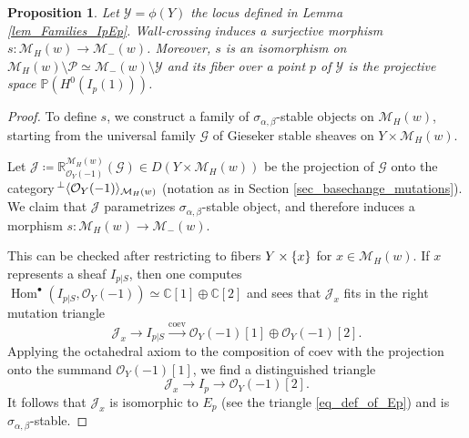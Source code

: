 \documentclass[11pt]{amsart}
\newtheorem{proposition}[thm]{Proposition}
\theoremstyle{definition}
\newcommand{\C}{\mathbb{C}}
\DeclareMathOperator{\Hom}{Hom}
\newcommand{\sO}{\mathcal{O}}
\newcommand{\sY}{\mathcal{Y}}
\newcommand{\sT}{\mathcal{T}}
\newcommand{\sM}{\mathcal{M}}
\newcommand{\sG}{\mathcal{G}}
\DeclarePairedDelimiter{\set}{\lbrace}{\rbrace}
\DeclarePairedDelimiter{\pair}{\langle}{\rangle}
\begin{document}
\begin{proposition}\label{prop_GiesekerVSTilt}
Let $\sY =\phi(Y)$ the locus defined in Lemma \ref{lem_Families_IpEp}.
Wall-crossing induces a surjective morphism $s:\sM_H(w) \to \mathcal{M}_-(w)$. Moreover, $s$ is an isomorphism on $\sM_H(w) \setminus \mathcal{P}\simeq \mathcal{M}_-(w)\setminus \sY$ and its fiber over a point $p$ of $\sY$ is the projective space $\mathbb P(H^0(I_p(1)))$. 
\end{proposition}

\begin{proof}

To define $s$, we construct a family of $\sigma_{\alpha,\beta}$-stable objects on $\sM_H(w)$, starting from the universal family $\sG$ of Gieseker stable sheaves on $Y\times \sM_H(w)$. 

Let $\mathcal J \coloneqq \mathbb R_{\sO_Y(-1)}^{\sM_H(w)}(\sG)\in D(Y\times \sM_H(w))$ be the projection of $\sG$ onto the category $\!^\perp\pair{\sO_Y(-1)}_{\sM_H(w)}$ (notation as in Section \ref{sec_basechange_mutations}). We claim that $\mathcal J$ parametrizes $\sigma_{\alpha,\beta}$-stable object, and therefore induces a morphism $s\colon\sM_H(w)\to \sM_-(w)$. 

This can be checked after restricting to fibers $Y\times \set{x}$ for $x\in \sM_H(w)$. 
If $x$ represents a sheaf $I_{p|S}$, then one computes $\Hom^\bullet(I_{p|S},\sO_Y(-1))\simeq \C[1]\oplus \C[2]$ and sees that
$\mathcal J_x$ fits in the right mutation triangle
\[ \mathcal J_x \to I_{p|S} \xrightarrow{\mathrm{coev}} \sO_Y(-1)[1]\oplus \sO_Y(-1)[2]. \]
Applying the octahedral axiom to the composition of $\mathrm{coev}$ with the projection onto the summand $\sO_Y(-1)[1]$, we find a distinguished triangle 
\[ \mathcal J_x \to I_p \to \sO_Y(-1)[2]. \]
It follows that $\mathcal J_x$ is isomorphic to $E_p$ (see the triangle \eqref{eq_def_of_Ep}) and is $\sigma_{\alpha,\beta}$-stable. 


\end{proof}
\end{document}
